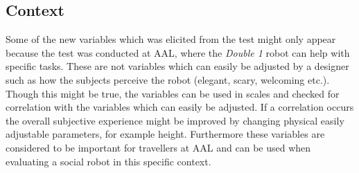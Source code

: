 \subsection{Context}
 Some of the new variables which was elicited from the test might only appear because the test was conducted at AAL, where the \textit{Double 1} robot can help with specific tasks. These are not variables which can easily be adjusted by a designer such as how the subjects perceive the robot (elegant, scary, welcoming etc.). Though this might be true, the variables can be used in scales and checked for correlation with the variables which can easily be adjusted. If a correlation occurs the overall subjective experience might be improved by changing physical easily adjustable parameters, for example height. Furthermore these variables are considered to be important for travellers at AAL and can be used when evaluating a social robot in this specific context. 